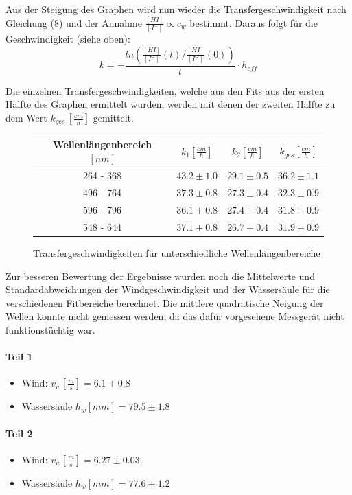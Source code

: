 \documentclass[12pt]{article}
\begin{document}
Aus der Steigung des Graphen wird nun wieder die Transfergeschwindigkeit nach Gleichung (8) und der Annahme $\frac{[HI]}{[I^-]} \propto c_w $ bestimmt.
Daraus folgt für die Geschwindigkeit (siehe oben):
\begin{equation}
k = - \frac{ln(\frac{[HI]}{[I^-]}(t)/\frac{[HI]}{[I^-]}(0))}{t} \cdot h_{eff}
\end{equation}

Die einzelnen Transfergeschwindigkeiten, welche aus den Fits aus der ersten Hälfte des Graphen ermittelt wurden, werden mit denen der zweiten Hälfte zu dem Wert $k_{ges} \, [\frac{cm}{h}]$ gemittelt.

\begin{figure}[H]
	\centering
	\begin{tabular}{c|c|c|c}
		Wellenlängenbereich $[nm]$ & $k_1 [\frac{cm}{h}]$ & $k_2 [\frac{cm}{h}]$ & $k_{ges} [\frac{cm}{h}] $ \\ \hline
		264 - 368 & $43.2 \pm 1.0$ & $29.1 \pm 0.5$ & $36.2 \pm 1.1$ \\
		496 - 764 & $37.3 \pm 0.8$ & $27.3 \pm 0.4$ & $32.3 \pm 0.9$ \\
		596 - 796 & $36.1 \pm 0.8$ & $27.4 \pm 0.4$ & $31.8 \pm 0.9$ \\
		548 - 644 & $37.1 \pm 0.8$ & $26.7 \pm 0.4$ & $31.9 \pm 0.9$
	\end{tabular}
	\caption{Transfergeschwindigkeiten für unterschiedliche Wellenlängenbereiche}
\end{figure}

Zur besseren Bewertung der Ergebnisse wurden noch die Mittelwerte und Standardabweichungen der Windgeschwindigkeit und der Wassersäule für die verschiedenen Fitbereiche berechnet. Die mittlere quadratische Neigung der Wellen konnte nicht gemessen werden, da das dafür vorgesehene Messgerät nicht funktionstüchtig war.

\paragraph{Teil 1}
\begin{itemize}
	\item Wind: $v_w [\frac{m}{s}] = 6.1 \pm 0.8 $
	\item Wassersäule $h_w[mm] = 79.5 \pm 1.8 $
\end{itemize}
\paragraph{Teil 2}
\begin{itemize}
	\item Wind: $v_w [\frac{m}{s}] = 6.27 \pm 0.03 $
	\item Wassersäule $h_w[mm] = 77.6 \pm 1.2 $
\end{itemize}
\end{document}
